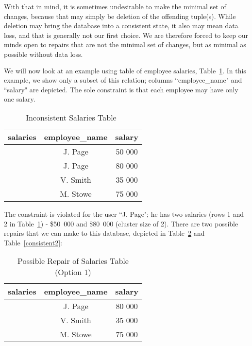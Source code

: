 \documentclass[a4paper]{report}
\begin{document}
With that in mind, it is sometimes undesirable to make the minimal set of changes, because that may simply be deletion of the offending tuple(s). While deletion may bring the database into a consistent state, it also may mean data loss, and that is generally not our first choice. We are therefore forced to keep our minds open to repairs that are not the minimal set of changes, but as minimal as possible without data loss.

We will now look at an example using table of employee salaries, Table~\ref{inconsistent1}. In this example, we show only a subset of this relation; columns ``employee\_name" and ``salary" are depicted. The sole constraint is that each employee may have only one salary.

\begin{table}[h]\begin{center}
        \begin{tabular}{r | c  c} 
					salaries & employee\_name & salary \\ \hline
	           		 & J. Page  & 50 000 \\ 
	         		 & J. Page  & 80 000 \\ 
					 & V. Smith & 35 000 \\ 
					 & M. Stowe & 75 000 \\ 
        \end{tabular}
        \caption[Inconsistent Salaries Table]{Inconsistent Salaries Table~\cite{CQ}\label{inconsistent1}}
\end{center}\end{table}

The constraint is violated for the user ``J. Page"; he has two salaries (rows 1 and 2 in Table~\ref{inconsistent1}) - \$50~000 and \$80~000 (cluster size of 2). There are two possible repairs that we can make to this database, depicted in Table~\ref{consistent1} and Table~\ref{consistent2}:

\begin{table}[h]\begin{center}
        \begin{tabular}{r | c  c} 
					salaries & employee\_name & salary \\ \hline
	         		 & J. Page  & 80 000 \\ 
					 & V. Smith & 35 000 \\ 
					 & M. Stowe & 75 000 \\ 
        \end{tabular}
        \caption[Possible Repair of Salaries Table (Option 1)]{Possible Repair of Salaries Table (Option 1) \cite{CQ}\label{consistent1}}
\end{center}\end{table}
\end{document}
